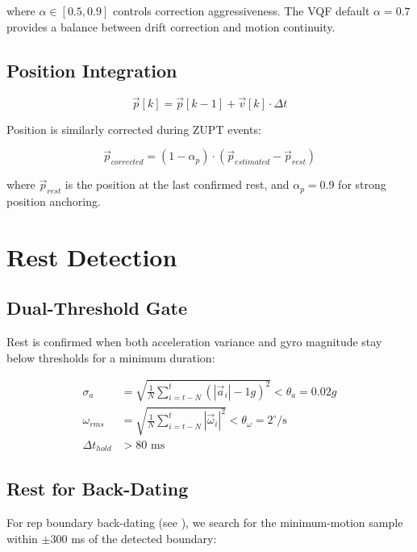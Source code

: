 where $\alpha \in [0.5, 0.9]$ controls correction aggressiveness. The VQF default $\alpha = 0.7$ provides a balance between drift correction and motion continuity.

\subsection{Position Integration}

\begin{equation}
    \vec{p}[k] = \vec{p}[k-1] + \vec{v}[k] \cdot \Delta t
\end{equation}

Position is similarly corrected during ZUPT events:

\begin{equation}
    \vec{p}_{corrected} = (1 - \alpha_p) \cdot (\vec{p}_{estimated} - \vec{p}_{rest})
\end{equation}

where $\vec{p}_{rest}$ is the position at the last confirmed rest, and $\alpha_p = 0.9$ for strong position anchoring.

\section{Rest Detection} \label{sec:rest_detection}

\subsection{Dual-Threshold Gate}

Rest is confirmed when both acceleration variance and gyro magnitude stay below thresholds for a minimum duration:

\begin{align}
    \sigma_a &= \sqrt{\frac{1}{N}\sum_{i=t-N}^{t} (|\vec{a}_i| - 1g)^2} < \theta_a = 0.02g \\
    \omega_{rms} &= \sqrt{\frac{1}{N}\sum_{i=t-N}^{t} |\vec{\omega}_i|^2} < \theta_\omega = 2^\circ/\text{s} \\
    \Delta t_{hold} &> 80 \text{ ms}
\end{align}

\subsection{Rest for Back-Dating}

For rep boundary back-dating (see ), we search for the minimum-motion sample within $\pm 300$ ms of the detected boundary:

